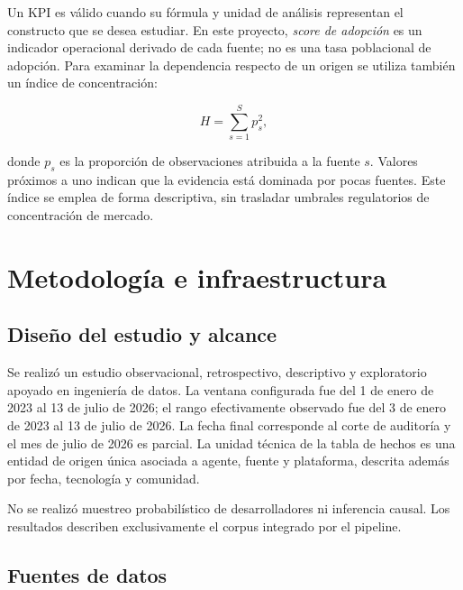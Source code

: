 \documentclass[12pt,a4paper]{article}
\begin{document}
Un KPI es válido cuando su fórmula y unidad de análisis representan el constructo que se desea estudiar. En este proyecto, \emph{score de adopción} es un indicador operacional derivado de cada fuente; no es una tasa poblacional de adopción. Para examinar la dependencia respecto de un origen se utiliza también un índice de concentración:

\begin{equation}
H = \sum_{s=1}^{S} p_s^2,
\end{equation}

donde $p_s$ es la proporción de observaciones atribuida a la fuente $s$. Valores próximos a uno indican que la evidencia está dominada por pocas fuentes. Este índice se emplea de forma descriptiva, sin trasladar umbrales regulatorios de concentración de mercado.

\section{Metodología e infraestructura}

\subsection{Diseño del estudio y alcance}

Se realizó un estudio observacional, retrospectivo, descriptivo y exploratorio apoyado en ingeniería de datos. La ventana configurada fue del 1 de enero de 2023 al 13 de julio de 2026; el rango efectivamente observado fue del 3 de enero de 2023 al 13 de julio de 2026. La fecha final corresponde al corte de auditoría y el mes de julio de 2026 es parcial. La unidad técnica de la tabla de hechos es una entidad de origen única asociada a agente, fuente y plataforma, descrita además por fecha, tecnología y comunidad.

No se realizó muestreo probabilístico de desarrolladores ni inferencia causal. Los resultados describen exclusivamente el corpus integrado por el pipeline.

\subsection{Fuentes de datos}
\end{document}
